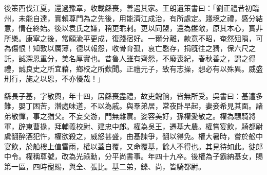 \begin{pinyinscope}
後策西伐江夏，還過豫章，收載繇喪，善遇其家。王朗遺策書曰：「劉正禮昔初臨州，未能自達，實賴尊門為之先後，用能濟江成治，有所處定。踐境之禮，感分結意，情在終始。後以袁氏之嫌，稍更乖剌。更以同盟，還為讎敵，原其本心，實非所樂。康寧之後，常願渝平更成，復踐宿好。一爾分離，款意不昭，奄然殂隕，可為傷恨！知敦以厲薄，德以報怨，收骨育孤，哀亡愍存，捐旣往之猜，保六尺之託，誠深恩重分，美名厚實也。昔魯人雖有齊怨，不廢喪紀，春秋善之，謂之得禮，誠良史之所宜藉，鄉校之所歎聞。正禮元子，致有志操，想必有以殊異。威盛刑行，施之以恩，不亦優哉！」

繇長子基，字敬輿，年十四，居繇喪盡禮，故吏餽餉，皆無所受。吳書曰：基遭多難，嬰丁困苦，潛處味道，不以為戚。與羣弟居，常夜卧早起，妻妾希見其面。諸弟敬憚，事之猶父。不妄交游，門無雜賔。姿容美好，孫權愛敬之。權為驃騎將軍，辟東曹掾，拜輔義校尉、建忠中郎。權為吳王，遷基大農。權嘗宴飲，騎都尉虞翻醉酒犯忤，權欲殺之，威怒甚盛，由基諫爭，翻以得免。權大暑時，嘗於舩中宴飲，於船樓上值雷雨，權以蓋自覆，又命覆基，餘人不得也。其見待如此。徙郎中令。權稱尊號，改為光祿勳，分平尚書事。年四十九卒。後權為子霸納基女，賜第一區，四時寵賜，與全、張比。基二弟，鑠、尚，皆騎都尉。


\end{pinyinscope}